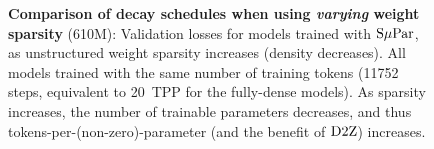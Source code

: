 \begin{figure}
  \centering
  \mbox{}
  \vspace{-1mm}
  \mbox{}
  \caption{\textbf{Comparison of decay schedules when using
      \emph{varying} weight sparsity} (610M): Validation losses for
    models trained with $\mbox{S$\mu$Par}$, as unstructured weight sparsity
    increases (density decreases).  All models trained with the same
    number of training tokens (11752 steps, equivalent to 20~TPP for
    the fully-dense models).  As sparsity increases, the number of
    trainable parameters decreases, and thus
    tokens-per-(non-zero)-parameter (and the benefit of $\mbox{D2Z}$)
    increases.\label{fig:cross_sparsity}}
\end{figure}
